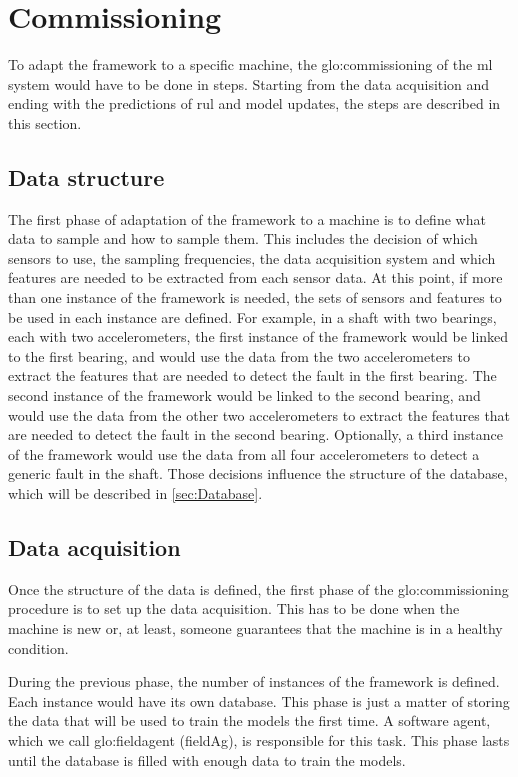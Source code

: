 \section{Commissioning}
\label{sec:commissioning}
To adapt the framework to a specific machine, the \gls{glo:commissioning} of the \gls{ml} system would have to be done in steps. Starting from the data acquisition and ending with the predictions of \gls{rul} and model updates, the steps are described in this section.

\subsection{Data structure}
\label{sec:Data_structure}
The first phase of adaptation of the framework to a machine is to define what data to sample and how to sample them. This includes the decision of which sensors to use, the sampling frequencies, the data acquisition system and which features are needed to be extracted from each sensor data. At this point, if more than one instance of the framework is needed, the sets of sensors and features to be used in each instance are defined. For example, in a shaft with two bearings, each with two accelerometers, the first instance of the framework would be linked to the first bearing, and would use the data from the two accelerometers to extract the features that are needed to detect the fault in the first bearing. The second instance of the framework would be linked to the second bearing, and would use the data from the other two accelerometers to extract the features that are needed to detect the fault in the second bearing. Optionally, a third instance of the framework would use the data from all four accelerometers to detect a generic fault in the shaft.
Those decisions influence the structure of the database, which will be described in \autoref{sec:Database}. 

\subsection{Data acquisition}
Once the structure of the data is defined, the first phase of the \gls{glo:commissioning} procedure is to set up the data acquisition. This has to be done when the machine is new or, at least, someone guarantees that the machine is in a healthy condition.

During the previous phase, the number of instances of the framework is defined. Each instance would have its own database. This phase is just a matter of storing the data that will be used to train the models the first time. A software agent, which we call \gls{glo:fieldagent} (\gls{fieldAg}), is responsible for this task. 
This phase lasts until the database is filled with enough data to train the models.

